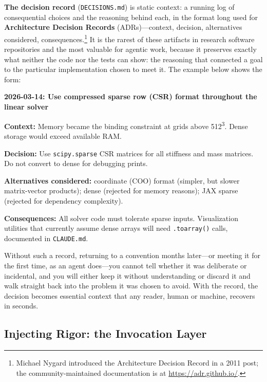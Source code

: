 \documentclass{IEEEcsmag}
\begin{document}
\textbf{The decision record} (\texttt{DECISIONS.md}) is static context: a running log of consequential choices and the reasoning behind each, in the format long used for \textbf{Architecture Decision Records} (ADRs)---context, decision, alternatives considered, consequences.\footnote{Michael Nygard introduced the Architecture Decision Record in a 2011 post; the community-maintained documentation is at \url{https://adr.github.io/}.} It is the rarest of these artifacts in research software repositories and the most valuable for agentic work, because it preserves exactly what neither the code nor the tests can show: the reasoning that connected a goal to the particular implementation chosen to meet it. The example below shows the form:

\par\medskip
\noindent\begin{minipage}{\columnwidth}
\setlength{\parskip}{0.5em}
\small
\textbf{2026-03-14: Use compressed sparse row (CSR) format throughout the linear solver}

\textbf{Context:} Memory became the binding constraint at grids above 512\textsuperscript{3}. Dense storage would exceed available RAM.

\textbf{Decision:} Use \texttt{scipy.sparse} CSR matrices for all stiffness and mass matrices. Do not convert to dense for debugging prints.

\textbf{Alternatives considered:} coordinate (COO) format (simpler, but slower matrix-vector products); dense (rejected for memory reasons); JAX sparse (rejected for dependency complexity).

\textbf{Consequences:} All solver code must tolerate sparse inputs. Visualization utilities that currently assume dense arrays will need \texttt{.toarray()} calls, documented in \texttt{CLAUDE.md}.

\end{minipage}
\par\medskip

Without such a record, returning to a convention months later---or meeting it for the first time, as an agent does---you cannot tell whether it was deliberate or incidental, and you will either keep it without understanding or discard it and walk straight back into the problem it was chosen to avoid. With the record, the decision becomes essential context that any reader, human or machine, recovers in seconds.

\subsection{Injecting Rigor: the Invocation Layer}
\end{document}
